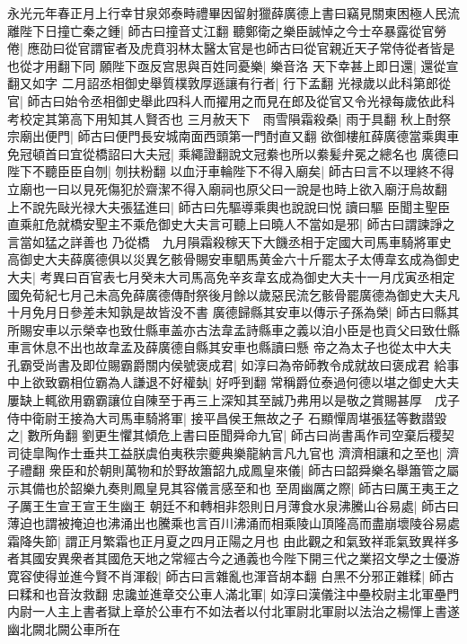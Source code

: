 永光元年春正月上行幸甘泉郊泰畤禮畢因留射獵薛廣德上書曰竊見關東困極人民流離陛下日撞亡秦之鍾|{
	師古曰撞音丈江翻}
聽鄭衛之樂臣誠悼之今士卒暴露從官勞倦|{
	應劭曰從官謂宦者及虎賁羽林太醫太官是也師古曰從官親近天子常侍從者皆是也從才用翻下同}
願陛下亟反宫思與百姓同憂樂|{
	樂音洛}
天下幸甚上即日還|{
	還從宣翻又如字}
二月詔丞相御史舉質樸敦厚遜讓有行者|{
	行下孟翻}
光禄歲以此科第郎從官|{
	師古曰始令丞相御史舉此四科人而擢用之而見在郎及從官又令光禄每歲依此科考校定其第高下用知其人賢否也}
三月赦天下　雨雪隕霜殺桑|{
	雨于具翻}
秋上酎祭宗廟出便門|{
	師古曰便門長安城南面西頭第一門酎直又翻}
欲御樓舡薛廣德當乘輿車免冠頓首曰宜從橋詔曰大夫冠|{
	乘繩證翻說文冠絭也所以絭髪弁冕之總名也}
廣德曰陛下不聽臣臣自刎|{
	刎扶粉翻}
以血汙車輪陛下不得入廟矣|{
	師古曰言不以理終不得立廟也一曰以見死傷犯於齋潔不得入廟祠也原父曰一說是也時上欲入廟汙烏故翻}
上不說先敺光禄大夫張猛進曰|{
	師古曰先驅導乘輿也說說曰悦讀曰驅}
臣聞主聖臣直乘舡危就橋安聖主不乘危御史大夫言可聽上曰曉人不當如是邪|{
	師古曰謂諫諍之言當如猛之詳善也}
乃從橋　九月隕霜殺稼天下大饑丞相于定國大司馬車騎將軍史高御史大夫薛廣德俱以災異乞骸骨賜安車駟馬黄金六十斤罷太子太傅韋玄成為御史大夫|{
	考異曰百官表七月癸未大司馬高免辛亥韋玄成為御史大夫十一月戊寅丞相定國免荀紀七月己未高免薛廣德傳酎祭後月餘以歲惡民流乞骸骨罷廣德為御史大夫凡十月免月日參差未知孰是故皆没不書}
廣德歸縣其安車以傳示子孫為榮|{
	師古曰縣其所賜安車以示榮幸也致仕縣車盖亦古法韋孟詩縣車之義以洎小臣是也貢父曰致仕縣車言休息不出也故韋孟及薛廣德自縣其安車也縣讀曰懸}
帝之為太子也從太中大夫孔霸受尚書及即位賜霸爵關内侯號褒成君|{
	如淳曰為帝師教令成就故曰褒成君}
給事中上欲致霸相位霸為人謙退不好權埶|{
	好呼到翻}
常稱爵位泰過何德以堪之御史大夫屢缺上輒欲用霸霸讓位自陳至于再三上深知其至誠乃弗用以是敬之賞賜甚厚　戊子侍中衛尉王接為大司馬車騎將軍|{
	接平昌侯王無故之子}
石顯憚周堪張猛等數譛毀之|{
	數所角翻}
劉更生懼其傾危上書曰臣聞舜命九官|{
	師古曰尚書禹作司空棄后稷契司徒皐陶作士垂共工益朕虞伯夷秩宗夔典樂龍納言凡九官也}
濟濟相讓和之至也|{
	濟子禮翻}
衆臣和於朝則萬物和於野故簫韶九成鳳皇來儀|{
	師古曰韶舜樂名舉簫管之屬示其備也於韶樂九奏則鳳皇見其容儀言感至和也}
至周幽厲之際|{
	師古曰厲王夷王之子厲王生宣王宣王生幽王}
朝廷不和轉相非怨則日月薄食水泉沸騰山谷易處|{
	師古曰薄迫也謂被掩迫也沸涌出也騰乘也言百川沸涌而相乘陵山頂隆高而盡崩壞陵谷易處}
霜降失節|{
	謂正月繁霜也正月夏之四月正陽之月也}
由此觀之和氣致祥乖氣致異祥多者其國安異衆者其國危天地之常經古今之通義也今陛下開三代之業招文學之士優游寛容使得並進今賢不肖渾殽|{
	師古曰言雜亂也渾音胡本翻}
白黑不分邪正雜糅|{
	師古曰糅和也音汝救翻}
忠讒並進章交公車人滿北軍|{
	如淳曰漢儀注中壘校尉主北軍壘門内尉一人主上書者獄上章於公車冇不如法者以付北軍尉北軍尉以法治之楊惲上書遂幽北闕北闕公車所在}
